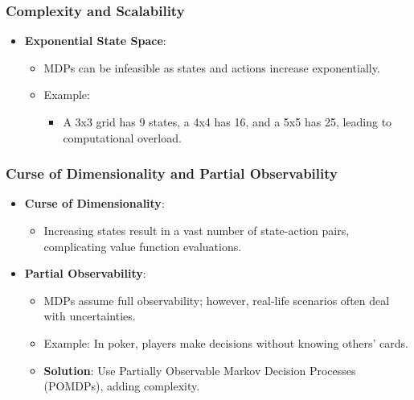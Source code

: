 \documentclass[aspectratio=169]{beamer}
\begin{document}
\begin{frame}[fragile]
    \frametitle{Complexity and Scalability}
    \begin{itemize}
        \item \textbf{Exponential State Space}:
        \begin{itemize}
            \item MDPs can be infeasible as states and actions increase exponentially.
            \item Example: 
            \begin{itemize}
                \item A 3x3 grid has 9 states, a 4x4 has 16, and a 5x5 has 25, leading to computational overload.
            \end{itemize}
        \end{itemize}
    \end{itemize}
\end{frame}

\begin{frame}[fragile]
    \frametitle{Curse of Dimensionality and Partial Observability}
    \begin{itemize}
        \item \textbf{Curse of Dimensionality}:
        \begin{itemize}
            \item Increasing states result in a vast number of state-action pairs, complicating value function evaluations.
        \end{itemize}
        
        \item \textbf{Partial Observability}:
        \begin{itemize}
            \item MDPs assume full observability; however, real-life scenarios often deal with uncertainties.
            \item Example: In poker, players make decisions without knowing others' cards.
            \item \textbf{Solution}: Use Partially Observable Markov Decision Processes (POMDPs), adding complexity.
        \end{itemize}
    \end{itemize}
\end{frame}
\end{document}
